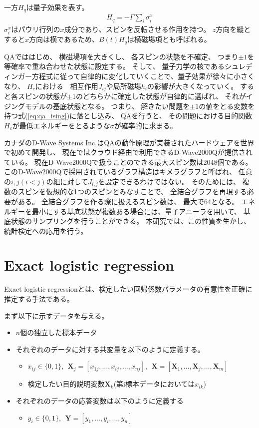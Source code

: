 \documentclass[12pt, dvipdfmx]{jmaster}
\theoremstyle{definition}
\begin{document}
一方$H_{q}$は量子効果を表す。
\begin{eqnarray}
	\label{eq:quantum}
	H_{q} = -\Gamma \sum_{i}\sigma^x_i
\end{eqnarray}
$\sigma^x_i$はパウリ行列の$x$成分であり、スピンを反転させる作用を持つ。
$z$方向を縦とすると$x$方向は横であるため、$B(t)H_{q}$は横磁場項とも呼ばれる。

QAでははじめ、 横磁場項を大きくし、 各スピンの状態を不確定、 つまり$\pm1$を等確率で重ね合わせた状態に設定する。
そして、 量子力学の核であるシュレディンガー方程式に従って自律的に変化していくことで、量子効果が徐々に小さくなり、 $H_{c}$における　相互作用$J_{ij}$や局所磁場$h_i$の影響が大きくなっていく。
すると各スピンの状態が$\pm1$のどちらかに確定した状態が自律的に選ばれ、 それがイジングモデルの基底状態となる。
つまり、 解きたい問題を$\pm1$の値をとる変数を持つ式(\ref{eq:qa_ising})に落とし込み、 QAを行うと、
その問題における目的関数$H_{c}$が最低エネルギーをとるような$\sigma$が確率的に求まる\cite{nishimori}。

カナダのD-Wave Systems Inc.はQAの動作原理が実装されたハードウェアを世界で初めて開発し、
現在ではクラウド経由で利用できるD-Wave2000Qが提供されている\cite{dwave}。
現在D-Wave2000Qで扱うことのできる最大スピン数は2048個である。 
このD-Wave2000Qで採用されているグラフ構造はキメラグラフと呼ばれ、
任意の$i,j(i<j)$の組に対して$J_{i,j}$を設定できるわけではない。
そのためには、 複数のスピンを仮想的な1つのスピンとみなすことで、 全結合グラフを再現する必要がある。
全結合グラフを作る際に扱えるスピン数は、 最大で64となる。
エネルギーを最小にする基底状態が複数ある場合には、量子アニーラを用いて、
基底状態のサンプリングを行うことができる\cite{mandra2017exponentially}。
本研究では、この性質を生かし、統計検定への応用を行う。

\section{Exact logistic regression}
Exact logistic regressionとは、検定したい回帰係数パラメータの有意性を正確に推定する手法である。

まず以下に示すデータを与える。
\begin{itemize}
\item $n$個の独立した標本データ
\item それぞれのデータに対する共変量を以下のように定義する。
\begin{itemize}
	\item $x_{ij} \in\{0, 1\}, ~~ \mathbf{X}_j = [x_{1j}, \dots, x_{ij}, \dots , x_{nj}], ~~　\mathbf{X} = [\mathbf{X}_1, \dots, \mathbf{X}_j, \dots , \mathbf{X}_m]$
	\item 検定したい目的説明変数$\mathbf{X}_k$(第i標本データにおいては$x_{ik}$)
\end{itemize}
\item それぞれのデータの応答変数は以下のように定義する
\begin{itemize}
	\item $y_i \in\{0, 1\}, ~~ \mathbf{Y} = [y_1, \dots, y_i, \dots , y_n]$
\end{itemize}
\end{itemize}
\end{document}
